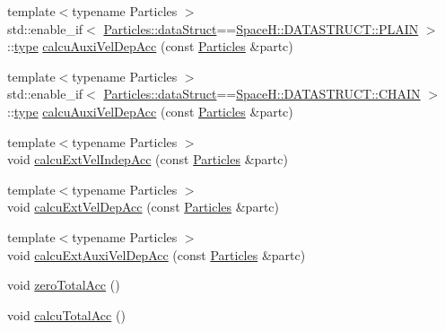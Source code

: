 \begin{DoxyCompactItemize}
\item 
{\footnotesize template$<$typename Particles $>$ }\\std\+::enable\+\_\+if$<$ \mbox{\hyperlink{class_space_h_1_1_vel_indep_particles_a066cbb08e0d444c27e2f71c30092e13f}{Particles\+::data\+Struct}}==\mbox{\hyperlink{namespace_space_h_a4782f089179a3c269891f02482b072dfaf62eb0bf5e5c72e80983fbbac1cb70e5}{Space\+H\+::\+D\+A\+T\+A\+S\+T\+R\+U\+C\+T\+::\+P\+L\+A\+IN}} $>$\+::\mbox{\hyperlink{class_space_h_1_1_interactions_aa45fc9367bfa0b8693700525ffa2655f}{type}} \mbox{\hyperlink{class_space_h_1_1_interactions_a99436e576da0455cd4ab795e3ccbc19a}{calcu\+Auxi\+Vel\+Dep\+Acc}} (const \mbox{\hyperlink{struct_space_h_1_1_particles}{Particles}} \&partc)
\item 
{\footnotesize template$<$typename Particles $>$ }\\std\+::enable\+\_\+if$<$ \mbox{\hyperlink{class_space_h_1_1_vel_indep_particles_a066cbb08e0d444c27e2f71c30092e13f}{Particles\+::data\+Struct}}==\mbox{\hyperlink{namespace_space_h_a4782f089179a3c269891f02482b072dfa014d2cf3cdc3af6f4f92c09190860e33}{Space\+H\+::\+D\+A\+T\+A\+S\+T\+R\+U\+C\+T\+::\+C\+H\+A\+IN}} $>$\+::\mbox{\hyperlink{class_space_h_1_1_interactions_aa45fc9367bfa0b8693700525ffa2655f}{type}} \mbox{\hyperlink{class_space_h_1_1_interactions_a738d79fa867f94cc9fcc5e0e017ed86b}{calcu\+Auxi\+Vel\+Dep\+Acc}} (const \mbox{\hyperlink{struct_space_h_1_1_particles}{Particles}} \&partc)
\item 
{\footnotesize template$<$typename Particles $>$ }\\void \mbox{\hyperlink{class_space_h_1_1_interactions_a56561622edc899080000b5bafce1fb79}{calcu\+Ext\+Vel\+Indep\+Acc}} (const \mbox{\hyperlink{struct_space_h_1_1_particles}{Particles}} \&partc)
\item 
{\footnotesize template$<$typename Particles $>$ }\\void \mbox{\hyperlink{class_space_h_1_1_interactions_a4d2c97809af5989a1a47def9e2fb0f35}{calcu\+Ext\+Vel\+Dep\+Acc}} (const \mbox{\hyperlink{struct_space_h_1_1_particles}{Particles}} \&partc)
\item 
{\footnotesize template$<$typename Particles $>$ }\\void \mbox{\hyperlink{class_space_h_1_1_interactions_aaebe1aae63825dea150b3892e487da02}{calcu\+Ext\+Auxi\+Vel\+Dep\+Acc}} (const \mbox{\hyperlink{struct_space_h_1_1_particles}{Particles}} \&partc)
\item 
void \mbox{\hyperlink{class_space_h_1_1_interactions_aa92db94c7328bdec6eb1729749589b5a}{zero\+Total\+Acc}} ()
\item 
void \mbox{\hyperlink{class_space_h_1_1_interactions_a03e732beb7595072c5861434cec1f24f}{calcu\+Total\+Acc}} ()
\end{DoxyCompactItemize}
